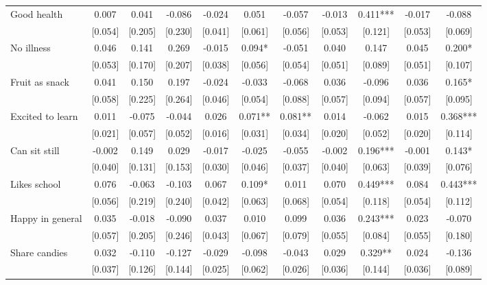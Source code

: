 \documentclass[12pt]{article}
\begin{document}
\begin{table}[ht]
\begin{center}
\begin{adjustbox}{width=1.2\textwidth,center=\textwidth}
\begin{tabular}{l*{10}{c}}
Good health & 0.007 & 0.041 & -0.086 & -0.024 & 0.051 & -0.057 & -0.013 & 0.411*** & -0.017 & -0.088 \\
 & [0.054] & [0.205] & [0.230] & [0.041] & [0.061] & [0.056] & [0.053] & [0.121] & [0.053] & [0.069] \\
No illness & 0.046 & 0.141 & 0.269 & -0.015 & 0.094* & -0.051 & 0.040 & 0.147 & 0.045 & 0.200* \\
 & [0.053] & [0.170] & [0.207] & [0.038] & [0.056] & [0.054] & [0.051] & [0.089] & [0.051] & [0.107] \\
Fruit as snack & 0.041 & 0.150 & 0.197 & -0.024 & -0.033 & -0.068 & 0.036 & -0.096 & 0.036 & 0.165* \\
 & [0.058] & [0.225] & [0.264] & [0.046] & [0.054] & [0.088] & [0.057] & [0.094] & [0.057] & [0.095] \\
Excited to learn & 0.011 & -0.075 & -0.044 & 0.026 & 0.071** & 0.081** & 0.014 & -0.062 & 0.015 & 0.368*** \\
 & [0.021] & [0.057] & [0.052] & [0.016] & [0.031] & [0.034] & [0.020] & [0.052] & [0.020] & [0.114] \\
Can sit still & -0.002 & 0.149 & 0.029 & -0.017 & -0.025 & -0.055 & -0.002 & 0.196*** & -0.001 & 0.143* \\
 & [0.040] & [0.131] & [0.153] & [0.030] & [0.046] & [0.037] & [0.040] & [0.063] & [0.039] & [0.076] \\
Likes school & 0.076 & -0.063 & -0.103 & 0.067 & 0.109* & 0.011 & 0.070 & 0.449*** & 0.084 & 0.443*** \\
 & [0.056] & [0.219] & [0.240] & [0.042] & [0.063] & [0.068] & [0.054] & [0.118] & [0.054] & [0.112] \\
Happy in general & 0.035 & -0.018 & -0.090 & 0.037 & 0.010 & 0.099 & 0.036 & 0.243*** & 0.023 & -0.070 \\
 & [0.057] & [0.205] & [0.246] & [0.043] & [0.067] & [0.079] & [0.055] & [0.084] & [0.055] & [0.180] \\
Share candies & 0.032 & -0.110 & -0.127 & -0.029 & -0.098 & -0.043 & 0.029 & 0.329** & 0.024 & -0.136 \\
 & [0.037] & [0.126] & [0.144] & [0.025] & [0.062] & [0.026] & [0.036] & [0.144] & [0.036] & [0.089] \\


\end{tabular}
\end{adjustbox}
\end{center}
\end{table}
\end{document}
